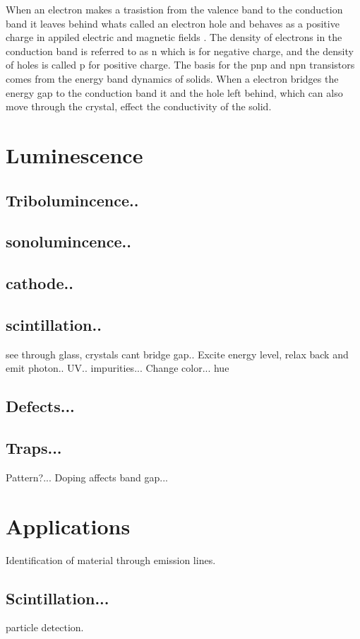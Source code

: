 \documentclass[prl,onecolumn]{revtex4-1}  %
\begin{document}
\par
When an electron makes a trasistion from the valence band to the conduction band it leaves behind whats called an electron hole and behaves as a positive charge in appiled electric and magnetic fields \cite{Kittel}. The density of electrons in the conduction band is referred to as n which is for negative charge, and the density of holes is called p for positive charge. The basis for the pnp and npn transistors comes from the energy band dynamics of solids.  
When a electron bridges the energy gap to the conduction band it and the hole left behind, which can also move through the crystal, effect the conductivity of the solid\cite{Chen}.


\section{Luminescence}
 
\subsection*{Tribolumincence..}
\subsection*{sonolumincence..}
\subsection*{cathode..}
\subsection*{scintillation..}

see through glass, crystals cant bridge gap..
Excite energy level, relax back and emit photon.. UV..
impurities...
Change color... hue
\subsection*{Defects...}
\subsection*{Traps...}
Pattern?...
Doping affects band gap...

\section{Applications}
Identification of material through emission lines.
\subsection*{Scintillation...}
particle detection.
\end{document}
